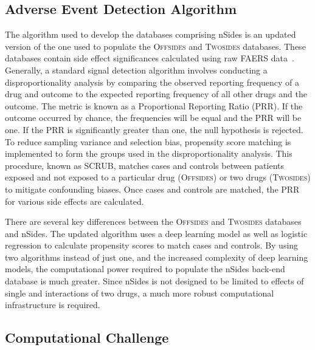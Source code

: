\documentclass{ws-procs11x85}
\begin{document}
\subsection{Adverse Event Detection Algorithm}
The algorithm used to develop the databases comprising nSides is an
updated version of the one used to populate the O\textsc{ffsides} and
T\textsc{wosides} databases.  These databases contain side effect
significances calculated using raw FAERS data~\cite{Tatonetti2012}.
Generally, a standard signal detection algorithm involves conducting a
disproportionality analysis by comparing the observed reporting
frequency of a drug and outcome to the expected reporting frequency of
all other drugs and the outcome. The metric is known as a Proportional
Reporting Ratio (PRR). If the outcome occurred by chance, the
frequencies will be equal and the PRR will be one. If the PRR is
significantly greater than one, the null hypothesis is rejected. To
reduce sampling variance and selection bias, propensity score matching
is implemented to form the groups used in the disproportionality
analysis. This procedure, known as SCRUB, matches cases and controls
between patients exposed and not exposed to a particular drug
(O\textsc{ffsides}) or two drugs (T\textsc{wosides}) to mitigate
confounding biases. Once cases and controls are matched, the PRR for
various side effects are calculated.

There are several key differences between the O\textsc{ffsides} and
T\textsc{wosides} databases and nSides. The updated algorithm uses a
deep learning model as well as logistic regression to calculate
propensity scores to match cases and controls. By using two algorithms
instead of just one, and the increased complexity of deep learning
models, the computational power required to populate the nSides
back-end database is much greater. Since nSides is not designed to be
limited to effects of single and interactions of two drugs, a much
more robust computational infrastructure is required.

\subsection{Computational Challenge}
\end{document}
